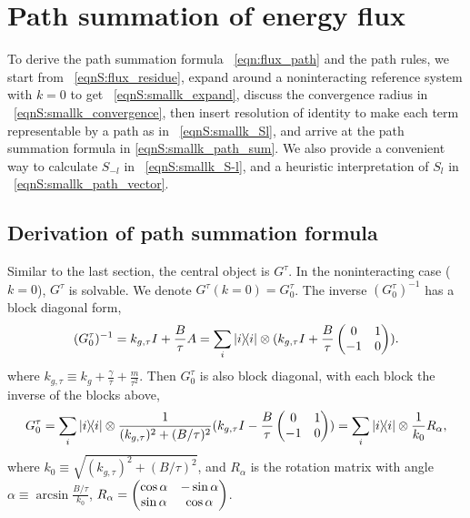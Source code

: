 \documentclass[
 amsmath,amssymb,
 aps,
 pre,
 longbibliography,
 10pt, onecolumn,
 notitlepage
]{revtex4-1}
\begin{document}
\section{Path summation of energy flux}
To derive the path summation formula \eqnname~\eqref{eqn:flux_path} and the path rules, we start from \eqnname~\eqref{eqnS:flux_residue}, expand around a noninteracting reference system with $k=0$ to get \eqnname~\eqref{eqnS:smallk_expand}, discuss the convergence radius in \eqnname~\eqref{eqnS:smallk_convergence}, then insert resolution of identity to make each term representable by a path as in \eqnname~\eqref{eqnS:smallk_Sl}, and arrive at the path summation formula in \eqref{eqnS:smallk_path_sum}.
We also provide a convenient way to calculate $S_{-l}$ in \eqnname~\eqref{eqnS:smallk_S-l}, and a heuristic interpretation of $S_l$ in \eqnname~\eqref{eqnS:smallk_path_vector}.

\subsection{Derivation of path summation formula}
Similar to the last section, the central object is $G^\tau$.
In the noninteracting case ($k=0$), $G^\tau$ is solvable. We denote $G^\tau(k=0) = G^\tau_0$.
The inverse $(G^\tau_0)^{-1}$ has a block diagonal form,
\begin{equation}
    (G^\tau_0)^{-1} = k_{g,\tau} I + \frac{B}{\tau}A
    = \sum_i \ketbra{i}{i} \otimes (k_{g,\tau}I + \frac{B}{\tau} \pmqty{0 & 1 \\ -1 & 0}).
\end{equation}
where $k_{g,\tau} \equiv k_g + \frac{\gamma}{\tau} + \frac{m}{\tau^2}$.
Then $G^\tau_0$ is also block diagonal, with each block the inverse of the blocks above,
\begin{equation} \label{eqnS:smallk_Gtau0}
    G^\tau_0 = \sum_i \ketbra{i}{i} \otimes \frac{1}{(k_{g,\tau})^2 + (B/\tau)^2}(k_{g,\tau} I - \frac{B}{\tau} \pmqty{0 & 1 \\ -1 & 0})
    = \sum_i \ketbra{i}{i} \otimes \frac{1}{k_0}R_\alpha,
\end{equation}
where $k_0 \equiv \sqrt{(k_{g,\tau})^2 + (B/\tau)^2}$, and $R_\alpha$ is the rotation matrix with angle $\alpha \equiv \arcsin{\frac{B/\tau}{k_0}}$, $R_\alpha = \pmqty{\cos\alpha & -\sin\alpha \\ \sin\alpha & \cos\alpha}$.
\end{document}
